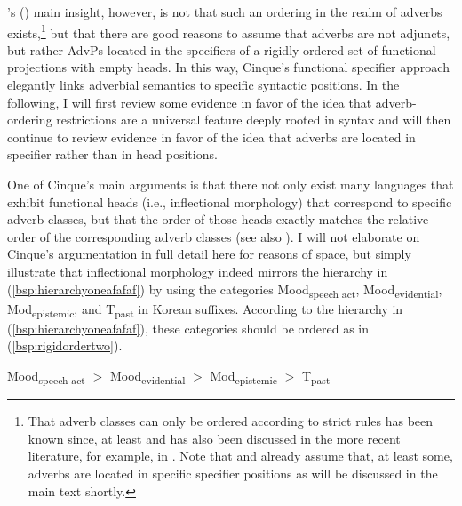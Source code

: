 \largerpage
\citeauthor{cinque1999adverbs}'s (\citeyear{cinque1999adverbs}) main insight, however, is not that such an ordering in the realm of adverbs exists,\footnote{ That adverb classes can only be ordered according to strict rules has been known since, at least \citet[622]{curme1905grammar} and has also been discussed in the more recent literature, for example, in \citet{jackendoff1972semantic, travis1988syntax, sportiche1988theory, alexiadou1997adverb, laenzlinger1998comparative}. Note that \citet{alexiadou1997adverb} and \citet{laenzlinger1998comparative} already assume that, at least some, adverbs are located in specific specifier positions as will be discussed in the main text shortly.} but that there are good reasons to assume that adverbs are not adjuncts, but rather AdvPs located in the specifiers of a rigidly ordered set of functional projections with empty heads. In this way, Cinque's functional specifier approach elegantly links adverbial semantics to specific syntactic positions. In the following, I will first review some evidence in favor of the idea that adverb-ordering restrictions are a universal feature deeply rooted in syntax and will then continue to review evidence in favor of the idea that adverbs are located in specifier rather than in head positions.

One of Cinque's main arguments is that there not only exist many languages that exhibit functional heads (i.e., inflectional morphology) that correspond to specific adverb classes, but that the order of those heads exactly matches the relative order of the corresponding adverb classes (see also \citealt{cinque2004issues}). I will not elaborate on Cinque's argumentation in full detail here for reasons of space, but simply illustrate that inflectional morphology indeed mirrors the hierarchy in (\ref{bsp:hierarchyoneafafaf}) by using the categories Mood\textsubscript{speech act}, Mood\textsubscript{evidential}, Mod\textsubscript{epistemic}, and T\textsubscript{past} in Korean suffixes. According to the hierarchy in (\ref{bsp:hierarchyoneafafaf}), these categories should be ordered as in (\ref{bsp:rigidordertwo}).

\begin{exe}
\ex\label{bsp:rigidordertwo} 
Mood\textsubscript{speech act} $>$ Mood\textsubscript{evidential} $>$ Mod\textsubscript{epistemic} $>$ T\textsubscript{past} 
\end{exe}

